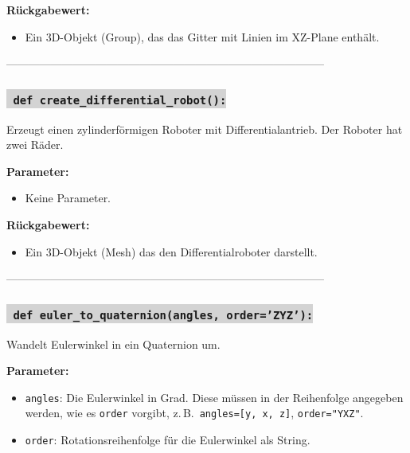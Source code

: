 \noindent \textbf{Rückgabewert:} \vspace{-6ex} \\
\begin{itemize}
    \setlength{\itemindent}{1em}
    \item Ein 3D-Objekt (Group), das das Gitter mit Linien im XZ-Plane enthält.
\end{itemize}

--------------------------------------------------------------------------------------

\subsubsection*{\colorbox{lightgray}{\texttt{\textbf{\color{green} def} \color{blue} create\_differential\_robot}\textbf{\texttt{():}}}}
Erzeugt einen zylinderförmigen Roboter mit Differentialantrieb. Der Roboter hat zwei Räder.

\noindent \textbf{Parameter:} \vspace{-6ex} \\
\begin{itemize}
    \setlength{\itemindent}{1em}  %
    \item Keine Parameter.
\end{itemize}

\noindent \textbf{Rückgabewert:} \vspace{-6ex} \\
\begin{itemize}
    \setlength{\itemindent}{1em}  %
    \item Ein 3D-Objekt (Mesh) das den Differentialroboter darstellt.
\end{itemize}

--------------------------------------------------------------------------------------


\subsubsection*{\colorbox{lightgray}{\texttt{\textbf{\color{green} def} \color{blue} euler\_to\_quaternion}\textbf{\texttt{(angles, order='ZYZ'):}}}}
Wandelt Eulerwinkel in ein Quaternion um.

\noindent \textbf{Parameter:} \vspace{-6ex} \\
\begin{itemize}
    \setlength{\itemindent}{1em}
    \item \texttt{angles}: Die Eulerwinkel in Grad. Diese müssen in der Reihenfolge angegeben werden, wie es \texttt{order} vorgibt, z.\,B.\ \texttt{angles=[y, x, z]}, \texttt{order="YXZ"}.
    \item \texttt{order}: Rotationsreihenfolge für die Eulerwinkel als String.
\end{itemize}

